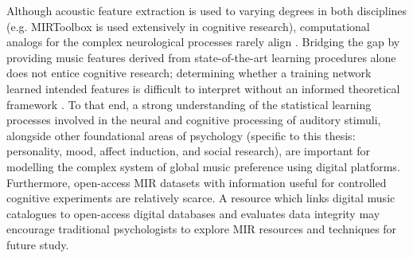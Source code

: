 \documentclass[a4paper]{article}
\begin{document}
Although acoustic feature extraction is used to varying degrees in both disciplines (e.g. MIRToolbox \cite{lartillot2007matlab} is used extensively in cognitive research), computational analogs for the complex neurological processes rarely align \cite{aucouturier2012mel,aucouturier2013seven}. Bridging the gap by providing music features derived from state-of-the-art learning procedures alone does not entice cognitive research; determining whether a training network learned intended features is difficult to interpret without an informed theoretical framework \cite{friedman2001elements}. To that end, a strong understanding of the statistical learning processes involved in the neural and cognitive processing of auditory stimuli, alongside other foundational areas of psychology (specific to this thesis: personality, mood, affect induction, and social research), are important for modelling the complex system of global music preference using digital platforms. Furthermore, open-access MIR datasets with information useful for controlled cognitive experiments are relatively scarce. A resource which links digital music catalogues to open-access digital databases and evaluates data integrity may encourage traditional psychologists to explore MIR resources and techniques for future study. 

\end{document}
